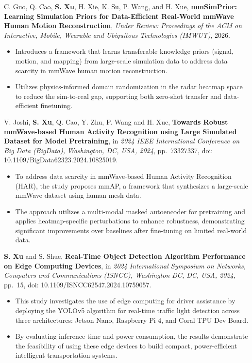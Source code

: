 \documentclass[10pt]{article}
\begin{document}
\noindent
C. Guo, Q. Cao, \textbf{S. Xu}, H. Xie, K. Su, P. Wang, and H. Xue,
\textbf{mmSimPrior: Learning Simulation Priors for Data-Efficient Real-World mmWave Human Motion Reconstruction},
\textit{Under Review: Proceedings of the ACM on Interactive, Mobile, Wearable and Ubiquitous Technologies (IMWUT)}, 2026.
\begin{itemize}
\item[{\color[RGB]{10,0,254}$\bullet$}] Introduces a framework that learns transferable knowledge priors (signal, motion, and mapping) from large-scale simulation data to address data scarcity in mmWave human motion reconstruction.
\item[{\color[RGB]{10,0,254}$\bullet$}] Utilizes physics-informed domain randomization in the radar heatmap space to reduce the sim-to-real gap, supporting both zero-shot transfer and data-efficient finetuning.
\end{itemize}

\noindent
    V. Joshi, \textbf{S. Xu}, Q. Cao, Y. Zhu, P. Wang and H. Xue,
    \textbf{Towards Robust mmWave-based Human Activity Recognition using Large Simulated Dataset for Model Pretraining},
    in \textit{2024 IEEE International Conference on Big Data (BigData), Washington, DC, USA, 2024},
    pp.\ 7332\textendash{}7337, doi: 10.1109/BigData62323.2024.10825019.
\begin{itemize}
    \item[{\color[RGB]{10,0,254}$\bullet$}] To address data scarcity in mmWave-based Human Activity Recognition (HAR), the study proposes mmAP, a framework that synthesizes a large-scale mmWave dataset using human mesh data.
    \item[{\color[RGB]{10,0,254}$\bullet$}] The approach utilizes a multi-modal masked autoencoder for pretraining and applies heatmap-specific perturbations to enhance robustness, demonstrating significant improvements over baselines after fine-tuning on limited real-world data.
\end{itemize}

\noindent
    \textbf{S. Xu} and S. Shue,
    \textbf{Real-Time Object Detection Algorithm Performance on Edge Computing Devices},
    in \textit{2024 International Symposium on Networks, Computers and Communications (ISNCC), Washington DC, DC, USA, 2024},
    pp.\ 1\textendash{}5, doi: 10.1109/ISNCC62547.2024.10759057.
\begin{itemize}
    \item[{\color[RGB]{10,0,254}$\bullet$}] This study investigates the use of edge computing for driver assistance by deploying the YOLOv5 algorithm for real-time traffic light detection across three architectures: Jetson Nano, Raspberry Pi 4, and Coral TPU Dev Board.
    \item[{\color[RGB]{10,0,254}$\bullet$}] By evaluating inference time and power consumption, the results demonstrate the feasibility of using these edge devices to build compact, power-efficient intelligent transportation systems.
\end{itemize}
\end{document}
